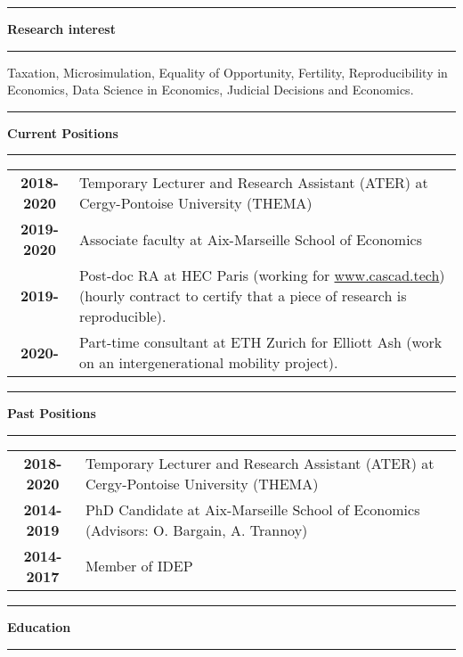 \documentclass[a4paper,11pt]{article} %
\newcommand{\titre}[1]{%
	\begin{center}
	\rule{\textwidth}{1pt}
	\par\vspace{0.1cm}
        \textbf{\large #1}
	\par\rule{\textwidth}{1pt}
	\end{center}
	}
\begin{document}
\titre{Research interest}


\begin{center}
{\justify
Taxation, Microsimulation, Equality of Opportunity, Fertility,
 Reproducibility in Economics, Data Science in Economics, Judicial Decisions and Economics.}
%  
\end{center}


\titre{Current Positions}

\begin{tabular}{c@{:  }p{}}
\textbf{2018-2020} & Temporary Lecturer and Research Assistant (ATER) at Cergy-Pontoise University (THEMA) \\

 \textbf{2019-2020} & Associate faculty at Aix-Marseille School of Economics \\
  \textbf{2019-} & Post-doc RA at HEC Paris (working for \url{www.cascad.tech}) (hourly contract to certify that a piece of research is reproducible).\\
 \textbf{2020-} & Part-time consultant at ETH Zurich for Elliott Ash (work on an intergenerational mobility project).  \\
  
\end{tabular}


\titre{Past Positions}

\begin{tabular}{c@{:  }p{}}
\textbf{2018-2020} & Temporary Lecturer and Research Assistant (ATER) at Cergy-Pontoise University (THEMA) \\
 \textbf{2014-2019} & PhD Candidate at Aix-Marseille School of Economics (Advisors: O. Bargain, A. Trannoy) \\
  \textbf{2014-2017} & Member of IDEP\\
  
\end{tabular}
\titre{Education}
\end{document}
